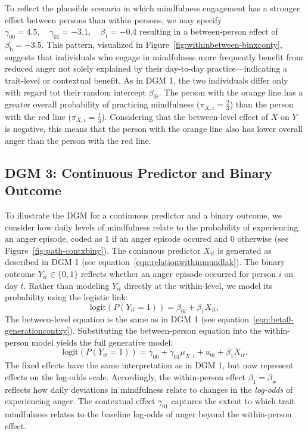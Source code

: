 To reflect the plausible scenario in which mindfulness engagement has a stronger effect between persons than within persons, we may specify $\gamma_{00} = 4.5, \quad \gamma_{01} = -3.1, \quad \beta_1 = -0.4$ resulting in a between-person effect of \( \beta_\text{b} = -3.5 \). This pattern, visualized in Figure~\ref{fig:withinbetween-binxconty}, suggests that individuals who engage in mindfulness more frequently benefit from reduced anger not solely explained by their day-to-day practice—indicating a trait-level or contextual benefit. As in DGM 1, the two individuals differ only with regard tot their random intercept $\beta_{0i}$. The person with the orange line has a greater overall probability of practicing mindfulness ($\pi_{X,i} = \frac{2}{3}$) than the person with the red line ($\pi_{X,i} = \frac{1}{3}$). Considering that the between-level effect of $X$ on $Y$ is negative, this means that the person with the orange line also has lower overall anger than the person with the red line.

% 

\subsection{DGM 3: Continuous Predictor and Binary Outcome}

To illustrate the DGM for a continuous predictor and a binary outcome, we consider how daily levels of mindfulness relate to the probability of experiencing an anger episode, coded as 1 if an anger episode occured and 0 otherwise (see Figure~\ref{fig:path-contxbiny}). The coninuous predictor $X_{it}$ is generated as described in DGM 1 (see equation~\ref{eqn:relationwithinmundlak}). The binary outcome \( Y_{it} \in \{0, 1\} \) reflects whether an anger episode occurred for person $i$ on day \( t \). Rather than modeling \( Y_{it} \) directly at the within-level, we model its probability using the logistic link:
\begin{equation}
    \label{eqn:logitwi}
    \text{logit}(P(Y_{it} = 1)) = \beta_{0i} + \beta_1 X_{it},
\end{equation}
The between-level equation is the same as in DGM 1 (see equation~\ref{eqn:beta0-generationcontxy}). Substituting the between-person equation into the within-person model yields the full generative model:
\begin{equation}
\text{logit}(P(Y_{it} = 1)) = \gamma_{00} + \gamma_{01} \mu_{X,i} + u_{0i} + \beta_1 X_{it}.
\end{equation}
The fixed effects have the same interpretation as in DGM 1, but now represent effects on the log-odds scale. Accordingly, the within-person effect \( \beta_1 = \beta_{\text{w}} \) reflects how daily deviations in mindfulness relate to changes in the \textit{log-odds} of experiencing anger. The contextual effect \( \gamma_{01} \) captures the extent to which trait mindfulness relates to the baseline log-odds of anger beyond the within-person effect.
    
